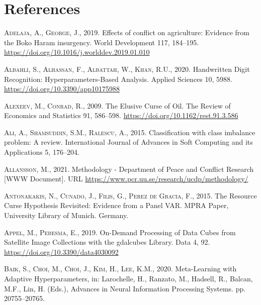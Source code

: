 \documentclass[a4paper,11pt]{article}
\begin{document}
\newpage

\hypertarget{references}{%
\section{References}\label{references}}

\noindent

\setlength{\parindent}{-0.5cm}
\setlength{\leftskip}{0.5cm}
\setlength{\parskip}{8pt}

\hypertarget{refs}{}
\leavevmode\hypertarget{ref-adelaja2019}{}%
\textsc{Adelaja, A., George, J.}, 2019. Effects of conflict on agriculture: Evidence from the Boko Haram insurgency. World Development 117, 184--195. \url{https://doi.org/10.1016/j.worlddev.2019.01.010}

\leavevmode\hypertarget{ref-albahli2020}{}%
\textsc{Albahli, S., Alhassan, F., Albattah, W., Khan, R.U.}, 2020. Handwritten Digit Recognition: Hyperparameters-Based Analysis. Applied Sciences 10, 5988. \url{https://doi.org/10.3390/app10175988}

\leavevmode\hypertarget{ref-alexeev2009}{}%
\textsc{Alexeev, M., Conrad, R.}, 2009. The Elusive Curse of Oil. The Review of Economics and Statistics 91, 586--598. \url{https://doi.org/10.1162/rest.91.3.586}

\leavevmode\hypertarget{ref-ali2015}{}%
\textsc{Ali, A., Shamsuddin, S.M., Ralescu, A.}, 2015. Classification with class imbalance problem: A review. International Journal of Advances in Soft Computing and its Applications 5, 176--204.

\leavevmode\hypertarget{ref-allansson}{}%
\textsc{Allansson, M.}, 2021. Methodology - Department of Peace and Conflict Research {[}WWW Document{]}. URL \url{https://www.pcr.uu.se/research/ucdp/methodology/}

\leavevmode\hypertarget{ref-antonakakis2015}{}%
\textsc{Antonakakis, N., Cunado, J., Filis, G., Perez de Gracia, F.}, 2015. The Resource Curse Hypothesis Revisited: Evidence from a Panel VAR. MPRA Paper, University Library of Munich. Germany.

\leavevmode\hypertarget{ref-appel2019}{}%
\textsc{Appel, M., Pebesma, E.}, 2019. On-Demand Processing of Data Cubes from Satellite Image Collections with the gdalcubes Library. Data 4, 92. \url{https://doi.org/10.3390/data4030092}

\leavevmode\hypertarget{ref-baik2020}{}%
\textsc{Baik, S., Choi, M., Choi, J., Kim, H., Lee, K.M.}, 2020. Meta-Learning with Adaptive Hyperparameters, in: Larochelle, H., Ranzato, M., Hadsell, R., Balcan, M.F., Lin, H. (Eds.), Advances in Neural Information Processing Systems. pp. 20755--20765.
\end{document}
